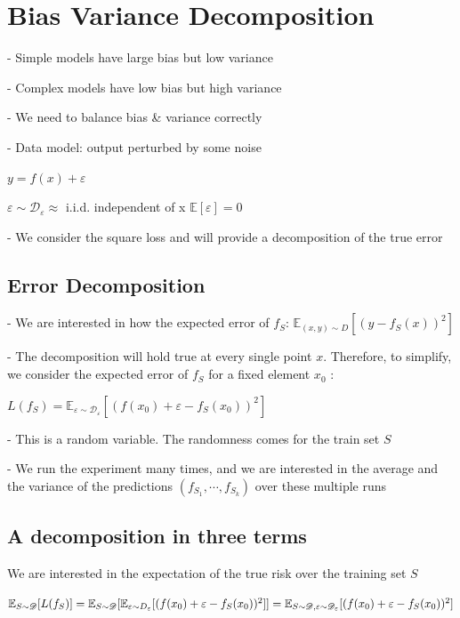 \section*{Bias Variance Decomposition}
- Simple models have large bias but low variance

- Complex models have low bias but high variance

- We need to balance bias \& variance correctly

- Data model: output perturbed by some noise

$y=f(x)+\varepsilon $

$\varepsilon\sim\mathscr{D}_\varepsilon \approx$ i.i.d. independent of x $\mathbb{E}[\varepsilon]=0$

- We consider the square loss and will provide a decomposition of the true error

\subsection*{Error Decomposition}

- We are interested in how the expected error of $f_{S}$:
$
\mathbb{E}_{(x, y) \sim D}\left[\left(y-f_{S}(x)\right)^{2}\right]
$

- The decomposition will hold true at every single point $x$. Therefore, to simplify, we consider the expected error of $f_{S}$ for a fixed element $x_{0}$ :

$
L\left(f_{S}\right)=\mathbb{E}_{\varepsilon \sim \mathscr{D}_{\varepsilon}}\left[\left(f\left(x_{0}\right)+\varepsilon-f_{S}\left(x_{0}\right)\right)^{2}\right]
$

- This is a random variable. The randomness comes for the train set $S$

- We run the experiment many times, and we are interested in the average and the variance of the predictions $\left(f_{S_{1}}, \cdots, f_{S_{k}}\right)$ over these multiple runs

\subsection*{A decomposition in three terms}
We are interested in the expectation of the true risk over the training set $S$

$\mathbb{E}_{S \sim \mathscr{D}}[L(f_{S})] \\= \mathbb{E}_{S \sim \mathscr{D}}[\mathbb{E}_{\varepsilon \sim D_{\varepsilon}}[(f(x_{0})+\varepsilon-f_{S}(x_{0}))^{2}]] \\= \mathbb{E}_{S \sim \mathscr{D}, \varepsilon \sim \mathscr{D}_{\varepsilon}}[(f(x_{0})+\varepsilon-f_{S}(x_{0}))^{2}]$



